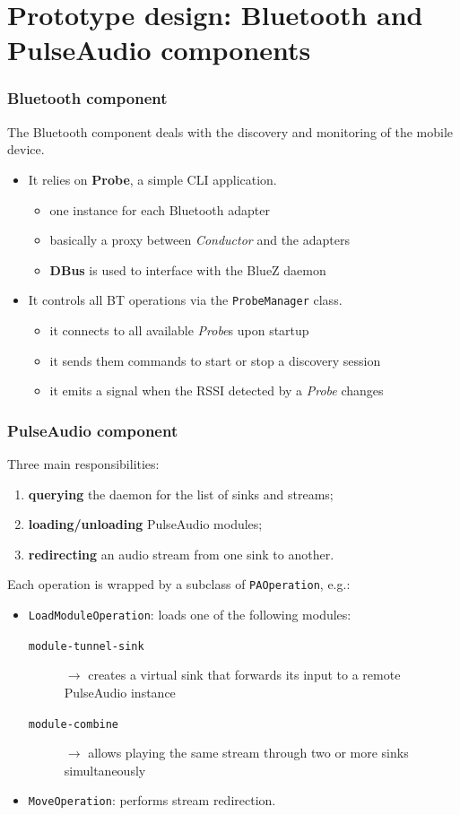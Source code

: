\documentclass{beamer}
\begin{document}

\section[Prototype design]{Prototype design: Bluetooth and PulseAudio components}

\begin{frame}
\frametitle{Bluetooth component}
The Bluetooth component deals with the discovery and monitoring of the mobile device.
\begin{itemize}
	\item It relies on \textbf{Probe}, a simple CLI application.
	\begin{itemize}
		\item one instance for each Bluetooth adapter
		\item basically a proxy between \textsl{Conductor} and the adapters
		\item \textbf{DBus} is used to interface with the BlueZ daemon
	\end{itemize}
	\item It controls all BT operations via the \texttt{ProbeManager} class.
	\begin{itemize}
		\item it connects to all available \textsl{Probe}s upon startup
		\item it sends them commands to start or stop a discovery session
		\item it emits a signal when the RSSI detected by a \textsl{Probe} changes
	\end{itemize}
\end{itemize}
\end{frame}

\begin{frame}
\frametitle{PulseAudio component}
Three main responsibilities:
\begin{enumerate}
	\item \textbf{querying} the daemon for the list of sinks and streams;
	\item \textbf{loading/unloading} PulseAudio modules;
	\item \textbf{redirecting} an audio stream from one sink to another.
\end{enumerate}
\pause\vspace{3mm}
Each operation is wrapped by a subclass of \texttt{PAOperation}, e.g.:
\begin{itemize}
	\item \texttt{LoadModuleOperation}: loads one of the following modules:
	\begin{description}
		\item[\texttt{module-tunnel-sink}] $\rightarrow$ creates a virtual sink that forwards its input to a remote PulseAudio instance
		\item[\texttt{module-combine}] $\rightarrow$ allows playing the same stream through two or more sinks simultaneously
	\end{description}
	\item \texttt{MoveOperation}: performs stream redirection.
\end{itemize}
\end{frame}
\end{document}
